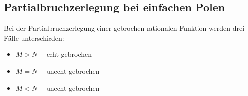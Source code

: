 	\subsection{Partialbruchzerlegung bei einfachen Polen}
		Bei der Partialbruchzerlegung einer gebrochen rationalen Funktion werden drei Fälle unterschieden:\\[0.3cm]
		\begin{minipage}{0.4\textwidth}
			\begin{itemize}
			\item $M > N\quad$ echt gebrochen\\[-0.35cm]
			\item $M = N\quad$ unecht gebrochen\\[-0.35cm]
			\item $M < N\quad$ unecht gebrochen\\[-0.35cm]
			\end{itemize}
		\end{minipage}
		\begin{minipage}{0.3\textwidth}
		\end{minipage}

